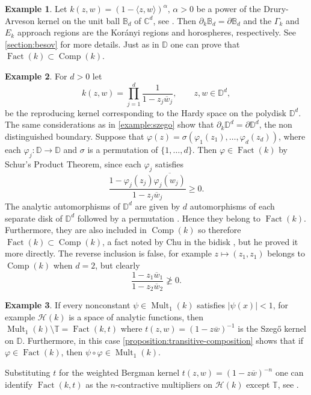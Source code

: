 \documentclass[leqno, final]{article}
\theoremstyle{definition}
\newtheorem{example}{Example}
\newcommand{\ball}{\mathbb{B}}
\newcommand{\disk}{\mathbb{D}}
\newcommand{\plane}{\mathbb{C}}
\newcommand{\torus}{\mathbb{T}}
\newcommand{\Hilbert}{\mathcal{H}}
\newcommand{\rand}{\partial}
\renewcommand{\phi}{\varphi}
\newcommand{\la}{\langle}
\newcommand{\ra}{\rangle}
\DeclareMathOperator{\Fact}{Fact}
\DeclareMathOperator{\Mult}{Mult}
\DeclareMathOperator{\Comp}{Comp}
\begin{document}
\begin{example}
Let $k(z,w) = (1-\la z,w\ra)^\alpha,\,\alpha>0$ be a power of the Drury-Arveson
kernel on the unit ball $\ball_d$ of $\plane^d$, see \cite{hartz_drury-arveson}.
Then $\rand_k\ball_d = \rand\ball_d$ and the $\Gamma_k$ and $E_k$ approach regions
are the Korányi regions and horospheres, respectively. See \cref{section:besov} for
more details. Just as in $\disk$ one can prove that $\Fact(k)\subset\Comp(k)$.
\end{example}

\begin{example}
For $d>0$ let \[
	k(z,w) = \prod_{j=1}^d\frac1{1-z_j\overline w_j}, \qquad z,w\in\disk^d,
\]
be the reproducing kernel corresponding to the Hardy space on the polydisk $\disk^d$.
The same considerations as in \cref{example:szego} show that $\rand_k\disk^d=\rand\disk^d$,
the non distinguished boundary.
Suppose that $\phi(z) = \sigma(\phi_1(z_1),\ldots,\phi_d(z_d))$, where each
$\phi_j:\disk\to\disk$ and $\sigma$ is a permutation of $\{1,\ldots,d\}$.
Then $\phi\in\Fact(k)$ by Schur's Product Theorem, since each $\phi_j$ satisfies \[
	\frac{1-\phi_j(z_j)\overline{\phi_j(w_j)}}{1-z_j\overline w_j} \geq0.
\]
The analytic automorphisms of $\disk^d$ are given by $d$ automorphisms of each separate
disk of $\disk^d$ followed by a permutation \cite{rudin_polydisk}. Hence they
belong to $\Fact(k)$. Furthermore, they are also included in $\Comp(k)$ so therefore
$\Fact(k)\subset\Comp(k)$, a fact noted by Chu in the bidisk \cite{chu_bidisk}, but
he proved it more directly. The reverse inclusion is false, for example $z\mapsto(z_1,z_1)$
belongs to $\Comp(k)$ when $d=2$, but clearly \[
	\frac{1-z_1\overline w_1}{1-z_2\overline w_2} \ngeq 0.
\]
\end{example}

\begin{example}
If every nonconstant $\psi\in\Mult_1(k)$ satisfies $|\psi(x)|<1$, for example $\Hilbert(k)$ is a space
of analytic functions, then $\Mult_1(k)\setminus\torus=\Fact(k,t)$ where
$t(z,w)=(1-z\overline w)^{-1}$ is the Szegő kernel on $\disk$.
Furthermore, in this case \cref{proposition:transitive-composition} shows that if $\phi\in\Fact(k)$,
then $\psi\circ\phi\in\Mult_1(k)$.

Substituting $t$ for the weighted Bergman kernel $t(z,w)=(1-z\overline w)^{-n}$ one can identify
$\Fact(k,t)$ as the $n$-contractive multipliers on $\Hilbert(k)$ except $\torus$, see \cite{gu_higher-order}.
\end{example}
\end{document}
